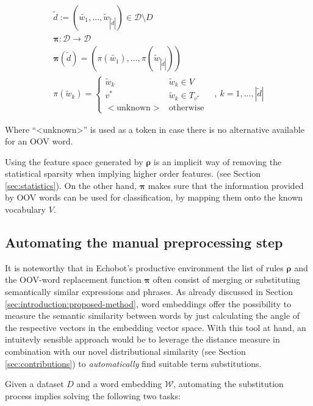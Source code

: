 \begin{eqnarray*}
\tilde{d} := (\tilde{w_1},\ldots,\tilde{w}_{|\tilde{d}|}) \in
\mathcal{D}\setminus D
\\
\boldsymbol\pi: \mathcal{D} \to \mathcal{D} \\
\boldsymbol\pi(\tilde{d}) =
(\pi(\tilde{w_1}),\ldots,\pi(\tilde{w}_{|\tilde{d}|})) \\
\pi(\tilde{w}_k) = \begin{cases} \tilde{w}_k & \tilde{w}_k \in V  \\
v^* & \tilde{w}_k \in T_{v^*} \\ 
\mathrm{<unknown>} & \mathrm{otherwise} \end{cases}& ,~k=1,\ldots,|\tilde{d}| 
\end{eqnarray*}

Where ``<unknown>'' is used as a token in case there is no alternative available
for an OOV word. 

Using the feature space generated by $\boldsymbol\rho$ is an implicit way
of removing the statistical sparsity when implying higher order features. 
(see Section \ref{sec:statistics}). 
On the other hand, $\boldsymbol\pi$ makes sure that the information provided by
OOV words can be used for classification, by mapping them onto the known
vocabulary $V$.

\subsection{Automating the manual preprocessing step}

It is noteworthy that in Echobot's productive environment the
list of rules  $\boldsymbol\rho$ and the OOV-word replacement function
$\boldsymbol\pi$ often consist of merging or substituting semantically similar
expressions and phrases.
As already discussed in Section \ref{sec:introduction:proposed-method}, word
embeddings offer the possibility to measure the semantic similarity between
words by just calculating the angle of the respective vectors in the embedding
vector space. With this tool at hand, an intuitevly sensible approach would be
to leverage the distance measure in combination with our novel distributional
similarity (see Section \ref{sec:contributions}) to \emph{automatically} find
suitable term substitutions. 

Given a dataset $D$ and a word embedding $\mathcal{W}$, automating the
substitution process implies solving the following two tasks:

